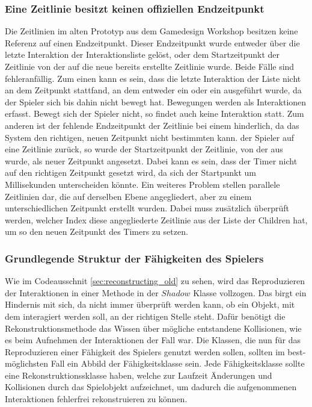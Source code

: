 \subsubsection{Eine Zeitlinie besitzt keinen offiziellen Endzeitpunkt}
Die Zeitlinien im alten Prototyp aus dem Gamedesign Workshop besitzen keine Referenz auf einen Endzeitpunkt. Dieser Endzeitpunkt wurde entweder über die letzte Interaktion der Interaktionsliste gelöst, oder dem Startzeitpunkt der Zeitlinie von der auf die neue bereits erstellte Zeitlinie  wurde. Beide Fälle sind fehleranfällig. Zum einen kann es sein, dass die letzte Interaktion der Liste nicht an dem Zeitpunkt stattfand, an dem entweder ein  oder ein  ausgeführt wurde, da der Spieler sich bis dahin nicht bewegt hat. Bewegungen werden als Interaktionen erfasst. Bewegt sich der Spieler nicht, so findet auch keine Interaktion statt. Zum anderen ist der fehlende Endzeitpunkt der Zeitlinie bei einem  hinderlich, da das System den richtigen, neuen Zeitpunkt nicht bestimmten kann.  der Spieler auf eine Zeitlinie zurück, so wurde der Startzeitpunkt der Zeitlinie, von der aus  wurde, als neuer Zeitpunkt angesetzt. Dabei kann es sein, dass der Timer nicht auf den richtigen Zeitpunkt gesetzt wird, da sich der Startpunkt um Millisekunden unterscheiden könnte. Ein weiteres Problem stellen parallele Zeitlinien dar, die auf derselben Ebene angegliedert, aber zu einem unterschiedlichen Zeitpunkt erstellt wurden. Dabei muss zusätzlich überprüft werden, welcher Index diese angegliederte Zeitlinie aus der Liste der Children hat, um so den neuen Zeitpunkt des Timers zu setzen.

\subsubsection{Grundlegende Struktur der Fähigkeiten des Spielers}
Wie im Codeausschnit \ref{sec:reconstructing_old} zu sehen, wird das Reproduzieren der Interaktionen in einer Methode in der $Shadow$ Klasse vollzogen. Das birgt ein Hindernis mit sich, da nicht immer überprüft werden kann, ob ein Objekt, mit dem interagiert werden soll, an der richtigen Stelle steht. Dafür benötigt die Rekonstruktionsmethode das Wissen über mögliche entstandene Kollisionen, wie es beim Aufnehmen der Interaktionen der Fall war. Die Klassen, die nun für das Reproduzieren einer Fähigkeit des Spielers genutzt werden sollen, sollten im best-möglichsten Fall ein Abbild der Fähigkeitsklasse sein. Jede Fähigkeitsklasse sollte eine Rekonstruktionssklasse haben, welche zur Laufzeit Änderungen und Kollisionen durch das Spielobjekt aufzeichnet, um dadurch die aufgenommenen Interaktionen fehlerfrei rekonstruieren zu können.

